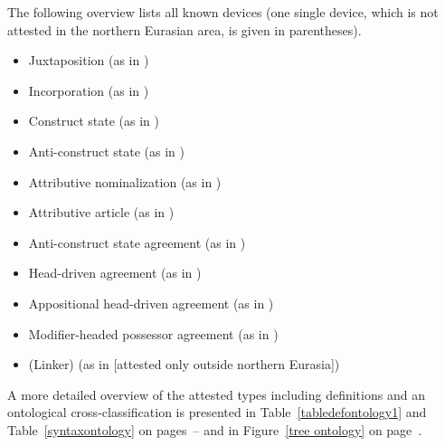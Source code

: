 The following overview lists all known devices (one single device, which is not attested in the northern Eurasian area, is given in parentheses).

\newpage 
\begin{itemize}
\item{Juxtaposition} (as in )
\item{Incorporation} (as in )
\item{Construct state} (as in )
\item{Anti\hyp{}construct state} (as in )
\item{Attributive nominalization} (as in )
\item{Attributive article} (as in )
\item{Anti\hyp{}construct state agreement} (as in )
\item{Head\hyp{}driven agreement} (as in )
\item{Appositional head\hyp{}driven agreement} (as in )
\item{Modifier\hyp{}headed possessor agreement} (as in )
\item{(Linker)} (as in  [attested only outside northern Eurasia])
\end{itemize}
A more detailed overview of the attested types including definitions and an ontological cross-classification is presented in Table~\ref{tabledefontology1} and Table~\ref{syntaxontology} on pages~\pageref{tabledefontology1}–\pageref{syntaxontology} and in Figure~\ref{tree ontology} on page~\pageref{tree ontology}.

